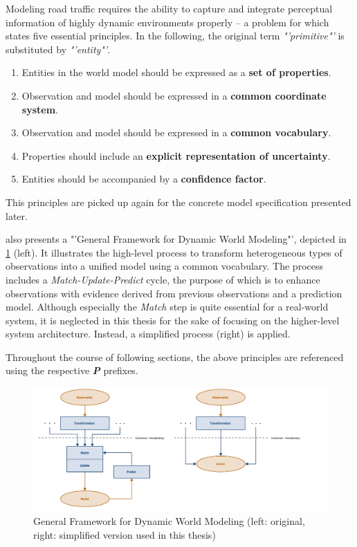 \begin{samepage}
	Modeling road traffic requires the ability to capture and integrate perceptual information of highly dynamic environments properly – a problem for which \cite{Crowley1993} states five essential principles. In the following, the original term \textit{"'primitive"'} is substituted by \textit{"'entity"'}. 
	
	\begin{enumerate}[\ \ P1:]
		\item Entities in the world model should be expressed as a \textbf{set of properties}.
		\item Observation and model should be expressed in a \textbf{common coordinate system}.
		\item Observation and model should be expressed in a \textbf{common vocabulary}.
		\item Properties should include an \textbf{explicit representation of uncertainty}.
		\item Entities should be accompanied by a \textbf{confidence factor}.
	\end{enumerate}
\end{samepage}

This principles are picked up again for the concrete model specification presented later.

\cite{Crowley1993} also presents a "'General Framework for Dynamic World Modeling"', depicted in \cref{fig:dynamic_world_modeling} (left). It illustrates the high-level process to transform heterogeneous types of observations into a unified model using a common vocabulary. The process includes a \textit{Match-Update-Predict} cycle, the purpose of which is to enhance observations with evidence derived from previous observations and a prediction model. Although especially the \textit{Match} step is quite essential for a real-world system, it is neglected in this thesis for the sake of focusing on the higher-level system architecture. Instead, a simplified process (right) is applied.

Throughout the course of following sections, the above principles are referenced using the respective \textit{\textbf{P}} prefixes.

\begin{figure}
	\centering
	\includegraphics[width=1.0\linewidth]{98_images/dynamic_world_modeling}
	\caption[General Framework for Dynamic World Modeling]{General Framework for Dynamic World Modeling \cite{Crowley1993} (left: original, right: simplified version used in this thesis)}
	\label{fig:dynamic_world_modeling}
\end{figure}

